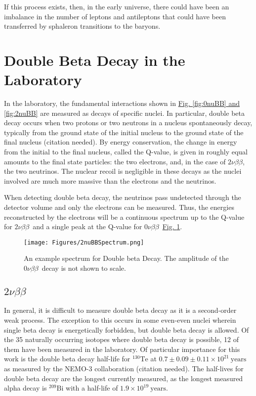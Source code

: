 \documentclass[12pt,a4paper]{article}
\newcommand{\zeronubb}{$0\nu \beta \beta$}
\newcommand{\twonubb}{$2\nu \beta \beta$}
\begin{document}
If this process exists, then, in the early universe, there could have been an imbalance in the number of leptons and antileptons that could have been transferred by sphaleron transitions to the baryons.


\section{Double Beta Decay in the Laboratory}

In the laboratory, the fundamental interactions shown in \hyperref[fig:2nuBB]{Fig. \ref{fig:0nuBB} and \ref{fig:2nuBB}} are measured as decays of specific nuclei. In particular, double beta decay occurs when two protons or two neutrons in a nucleus spontaneously decay, typically from the ground state of the initial nucleus to the ground state of the final nucleus (\color{blue}citation needed\color{black}). By energy conservation, the change in energy from the initial to the final nucleus, called the Q-value, is given in roughly equal amounts to the final state particles: the two electrons, and, in the case of \twonubb, the two neutrinos. The nuclear recoil is negligible in these decays as the nuclei involved are much more massive than the electrons and the neutrinos. 

When detecting double beta decay, the neutrinos pass undetected through the detector volume and only the electrons can be measured. Thus, the energies reconstructed by the electrons will be a continuous spectrum up to the Q-value for \twonubb~and a single peak at the Q-value for \zeronubb~\hyperref[fig:2nubbspectrum]{Fig. \ref{fig:2nubbspectrum}}.

\begin{figure} [h]
\centering
\texttt{[image: Figures/2nuBBSpectrum.png]}
\caption{An example spectrum for Double beta Decay. The amplitude of the \zeronubb~decay is not shown to scale.}
\label{fig:2nubbspectrum}
\end{figure}


\subsection{\twonubb}
In general, it is difficult to measure double beta decay as it is a second-order weak process. The exception to this occurs in some even-even nuclei wherein single beta decay is energetically forbidden, but double beta decay is allowed. Of the 35 naturally occurring isotopes where double beta decay is possible, 12 of them have been measured in the laboratory. Of particular importance for this work is the double beta decay half-life for $^{130}\textrm{Te}$ at $0.7 \pm 0.09 \pm 0.11 \times 10^{21}~\textrm{years}$ as measured by the NEMO-3 collaboration (\color{blue}citation needed\color{black}). The half-lives for double beta decay are the longest currently measured, as the longest measured alpha decay is $^{209}\textrm{Bi}$ with a half-life of $1.9 \times 10^{19}~\textrm{years}$.
\end{document}
